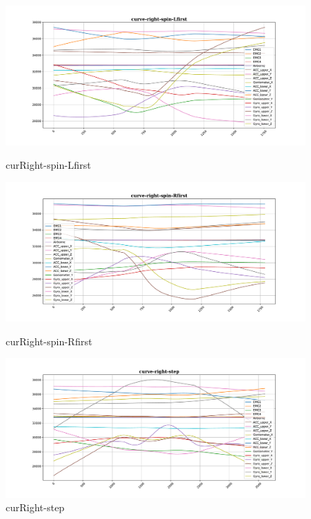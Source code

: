 \begin{figure}[!tbp]
	\begin{minipage}[b]{0.31\textwidth}
		\includegraphics[width=\textwidth]{images/curve-right-spin-Lfirst_example.pdf}
		\caption{curRight-spin-Lfirst}
	\end{minipage}
	\begin{minipage}[b]{0.31\textwidth}
		\includegraphics[width=\textwidth]{images/curve-right-spin-Rfirst_example.pdf}
		\caption{curRight-spin-Rfirst}
	\end{minipage}
	\begin{minipage}[b]{0.31\textwidth}
		\includegraphics[width=\textwidth]{images/curve-right-step_example.pdf}
		\caption{curRight-step}
	\end{minipage}
\end{figure}



